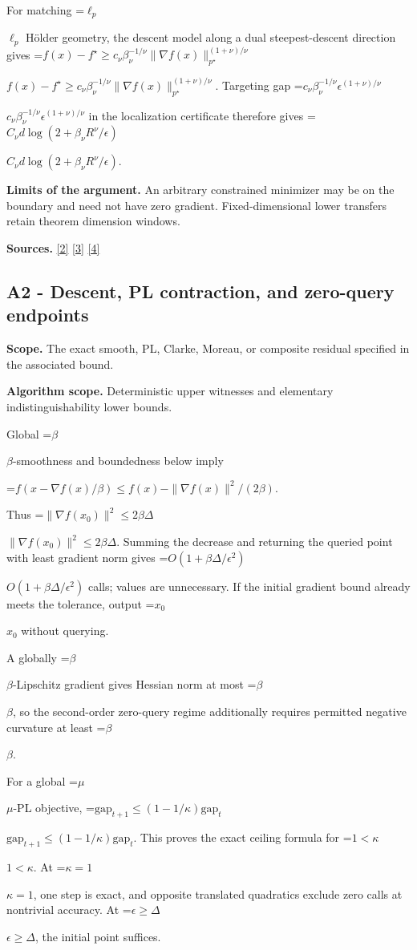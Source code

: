 \documentclass[10pt,a4paper]{article}
\newcommand{\AtlasMath}[1]{\par\begingroup\centering\setbox0=\hbox{$\displaystyle #1$}\ifdim\wd0>1.4\linewidth\typeout{ATLAS WIDE FORMULA: \the\wd0}\fi\ifdim\wd0>\linewidth\resizebox{\linewidth}{!}{\box0}\else\box0\fi\par\endgroup}
\newcommand{\AtlasInlineMath}[1]{\begingroup\setbox0=\hbox{$#1$}\ifdim\wd0>.4\linewidth\endgroup\AtlasMath{#1}\else\endgroup$#1$\fi}
\begin{document}
For matching \AtlasInlineMath{\ell_p} Hölder geometry, the descent model along a dual steepest-descent direction gives
\AtlasInlineMath{f(x)-f^\star\ge c_\nu\beta_\nu^{-1/\nu}\|\nabla f(x)\|_{p^\star}^{(1+\nu)/\nu}}.
Targeting gap \AtlasInlineMath{c_\nu\beta_\nu^{-1/\nu}\epsilon^{(1+\nu)/\nu}} in the localization certificate therefore gives
\AtlasInlineMath{C_\nu d\log(2+\beta_\nu R^\nu/\epsilon)}.

\textbf{Limits of the argument.} An arbitrary constrained minimizer may be on the boundary and need not have zero gradient. Fixed-dimensional lower transfers retain theorem dimension windows.

\textbf{Sources.} \href{https://arxiv.org/pdf/2101.09740v2}{[2]} \href{https://arxiv.org/pdf/2609.33360v2}{[3]} \href{https://arxiv.org/pdf/2609.10874}{[4]}

\subsection{A2 - Descent, PL contraction, and zero-query endpoints}
\textbf{Scope.} The exact smooth, PL, Clarke, Moreau, or composite residual specified in the associated bound.

\textbf{Algorithm scope.} Deterministic upper witnesses and elementary indistinguishability lower bounds.

Global \AtlasInlineMath{\beta}-smoothness and boundedness below imply

\AtlasMath{f(x-\nabla f(x)/\beta)\le f(x)-\|\nabla f(x)\|^2/(2\beta).}

Thus \AtlasInlineMath{\|\nabla f(x_0)\|^2\le2\beta\Delta}. Summing the decrease and returning the queried point with least gradient norm gives \AtlasInlineMath{O(1+\beta\Delta/\epsilon^2)} calls; values are unnecessary. If the initial gradient bound already meets the tolerance, output \AtlasInlineMath{x_0} without querying.

A globally \AtlasInlineMath{\beta}-Lipschitz gradient gives Hessian norm at most \AtlasInlineMath{\beta}, so the second-order zero-query regime additionally requires permitted negative curvature at least \AtlasInlineMath{\beta}.

For a global \AtlasInlineMath{\mu}-PL objective,
\AtlasInlineMath{\mathrm{gap}_{t+1}\le(1-1/\kappa)\mathrm{gap}_t}.
This proves the exact ceiling formula for \AtlasInlineMath{1<\kappa}. At \AtlasInlineMath{\kappa=1}, one step is exact, and opposite translated quadratics exclude zero calls at nontrivial accuracy. At \AtlasInlineMath{\epsilon\ge\Delta}, the initial point suffices.
\end{document}
